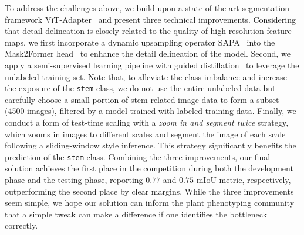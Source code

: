 To address the challenges above, we build upon a state-of-the-art segmentation framework ViT-Adapter~\cite{chen2022vision} and present three technical improvements. %
Considering that detail delineation is closely related to the quality of high-resolution feature maps, we first incorporate a dynamic upsampling operator SAPA~\cite{lu2022sapa} into the Mask2Former head~\cite{cheng2022masked} to enhance the detail delineation of the model. %
Second, we apply a semi-supervised learning pipeline with guided distillation~\cite{berrada2024guided} to leverage the unlabeled training set. Note that,   to alleviate the class imbalance and increase the exposure of the \texttt{stem} class, we do not use the entire unlabeled data but carefully choose a small portion of stem-related image data to form a subset (4500 images), filtered by a model trained with labeled training data. %
Finally, we conduct a form of test-time scaling with a \textit{zoom in and segment twice} strategy, which zooms in images to different scales and segment the image of each scale following a sliding-window style inference. This strategy significantly benefits the prediction of the \texttt{stem} class. %
Combining the three improvements, our final solution achieves the first place in the competition during both the development phase and the testing phase, reporting $0.77$ and $0.75$ mIoU metric, respectively, outperforming the second place by clear margins. While the three improvements seem simple, we hope our solution can inform the plant phenotyping community that a simple tweak can make a difference if one identifies the bottleneck correctly.